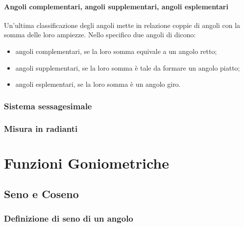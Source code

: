 \documentclass{report}
\begin{document}
\subsubsection{Angoli complementari, angoli supplementari, angoli esplementari} %
\label{sec:Angoli complementari, angoli supplementari, angoli esplementari}
Un'ultima classificazione degli angoli mette in relazione coppie di angoli con la somma delle loro ampiezze. Nello specifico due angoli di dicono:
\begin{itemize}
  \item{angoli complementari, se la loro somma equivale a un angolo retto;}
  \item{angoli supplementari, se la loro somma è tale da formare un angolo piatto;}
  \item{angoli esplementari, se la loro somma è un angolo giro.}
\end{itemize}


\subsection{Sistema sessagesimale} %
\label{sub:Sistema sessagesimale}


\subsection{Misura in radianti} %
\label{sub:Misura in radianti}




\chapter{Funzioni Goniometriche} %
\label{chap:Funzioni Goniometriche}

\section{Seno e Coseno} %
\label{sub:Seno e Coseno}

\subsection{Definizione di seno di un angolo} %
\label{sec:Definizione di seno di un angolo}
\end{document}
